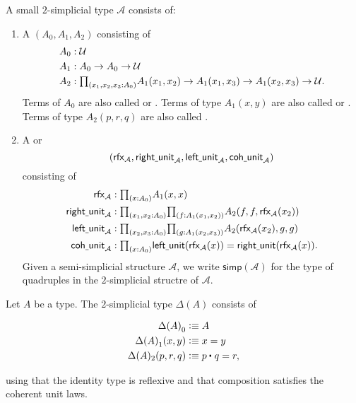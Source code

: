 \begin{defn}
A small $2$-simplicial type $\mathcal{A}$ consists of:
\begin{enumerate}
\item A  $(A_0,A_1,A_2)$ consisting of
\begin{align*}
A_0 & : \UU \\
A_1 & : A_0 \to A_0 \to \UU \\
A_2 & : \prd{x_1,x_2,x_3:A_0} A_1(x_1,x_2)\to A_1(x_1,x_3)\to A_1(x_2,x_3)\to\UU.
\end{align*}
Terms of $A_0$ are also called  or . Terms of type $A_1(x,y)$ are also called  or . Terms of type $A_2(p,r,q)$ are also called .
\item A  or 
\begin{equation*}
(\rfx{\mathcal{A}},\mathsf{right\usc{}unit}_{\mathcal{A}},\mathsf{left\usc{}unit}_{\mathcal{A}},\mathsf{coh\usc{}unit}_{\mathcal{A}})
\end{equation*}
consisting of
\begin{align*}
\rfx{\mathcal{A}} & : \prd{x:\pts{A}} \edg{A}(x,x) \\
\mathsf{right\usc{}unit}_{\mathcal{A}} & : \prd{x_1,x_2:A_0}{f:A_1(x_1,x_2)} A_2(f,f,\rfx{\mathcal{A}}(x_2)) \\
\mathsf{left\usc{}unit}_{\mathcal{A}} & : \prd{x_2,x_3:A_0}{g:A_1(x_2,x_3)} A_2(\rfx{\mathcal{A}}(x_2),g,g) \\
\mathsf{coh\usc{}unit}_{\mathcal{A}} & : \prd{x:A_0} \mathsf{left\usc{}unit}(\rfx{\mathcal{A}}(x))=\mathsf{right\usc{}unit}(\rfx{\mathcal{A}}(x)).
\end{align*}
Given a semi-simplicial structure $\mathcal{A}$, we write $\mathsf{simp}(\mathcal{A})$ for the type of quadruples in the $2$-simplicial structre of $\mathcal{A}$.
\end{enumerate}
\end{defn}

\begin{eg}
Let $A$ be a type. The  $2$-simplicial type $\Delta(A)$ consists of
\begin{samepage}
\begin{align*}
\pts{\Delta(A)} & \defeq A \\
\edg{\Delta(A)}(x,y) & \defeq x=y \\
\Delta(A)_2(p,r,q) & \defeq \ct{p}{q}=r,
\end{align*}
\end{samepage}%
using that the identity type is reflexive and that composition satisfies the coherent unit laws. 
\end{eg}

